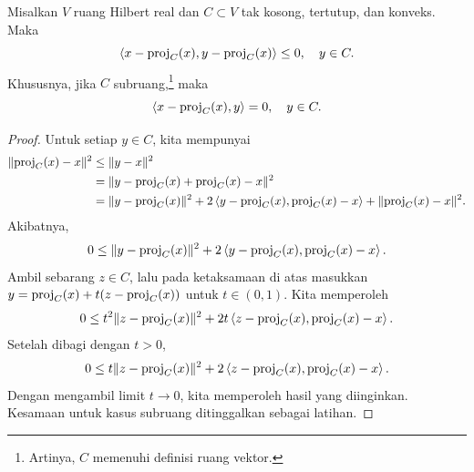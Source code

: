 \begin{lemma}
    Misalkan \(V\) ruang Hilbert real dan \(C\subset V\) tak kosong, tertutup, dan konveks. Maka
    \begin{equation}
        \left\langle x-\mathrm{proj}_C(x) , y-\mathrm{proj}_C(x)\right\rangle\leq 0,\quad y\in C.
    \end{equation}
    Khususnya, jika \(C\) subruang,\footnote{Artinya, \(C\) memenuhi definisi ruang vektor.} maka
    \begin{equation}
        \left\langle x-\mathrm{proj}_C(x) , y\right\rangle= 0,\quad y\in C.
    \end{equation}
\end{lemma}
\begin{proof}
    Untuk setiap \(y\in C\), kita mempunyai
    \begin{equation}
        \begin{aligned}
            \|\mathrm{proj}_C(x)-x\|^2
            &\leq \|y-x\|^2\\
            &= \|y - \mathrm{proj}_C(x) + \mathrm{proj}_C(x)-x\|^2\\
            &= \|y-\mathrm{proj}_C(x)\|^2
              + 2 \left\langle y-\mathrm{proj}_C(x) , \mathrm{proj}_C(x)-x\right\rangle
              + \|\mathrm{proj}_C(x)-x\|^2.
        \end{aligned}
    \end{equation}
    Akibatnya,
    \begin{equation}
        \begin{aligned}
            0\leq \|y-\mathrm{proj}_C(x)\|^2
            + 2 \left\langle y-\mathrm{proj}_C(x) , \mathrm{proj}_C(x)-x\right\rangle.
        \end{aligned}
    \end{equation}
    Ambil sebarang \(z\in C\), lalu pada ketaksamaan di atas masukkan
    \(y=\mathrm{proj}_C(x) + t(z-\mathrm{proj}_C(x))\) untuk \(t\in (0,1)\). Kita memperoleh
    \begin{equation}
        \begin{aligned}
            0\leq t^2 \|z-\mathrm{proj}_C(x)\|^2
            + 2 t\left\langle z-\mathrm{proj}_C(x) , \mathrm{proj}_C(x)-x\right\rangle.
        \end{aligned}
    \end{equation}
    Setelah dibagi dengan \(t>0\),
    \begin{equation}
        \begin{aligned}
            0\leq t \|z-\mathrm{proj}_C(x)\|^2
            + 2 \left\langle z-\mathrm{proj}_C(x) , \mathrm{proj}_C(x)-x\right\rangle.
        \end{aligned}
    \end{equation}
    Dengan mengambil limit \(t\rightarrow 0\), kita memperoleh hasil yang diinginkan. Kesamaan untuk kasus subruang ditinggalkan sebagai latihan.
\end{proof}

